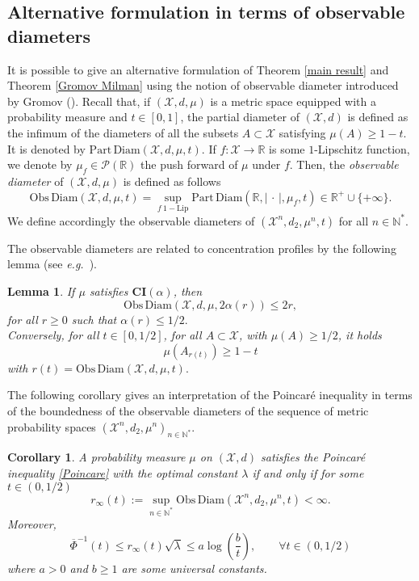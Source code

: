 \documentclass[11pt]{amsart}
\newtheorem{lem}[equation]{Lemma}
\newtheorem{cor}[equation]{Corollary}
\numberwithin{equation}{section}
\begin{document}
\subsection{Alternative formulation in terms of observable diameters} It is possible to give an alternative formulation of Theorem \ref{main result} and Theorem \ref{Gromov Milman} using the notion of observable diameter introduced by Gromov (\cite[Chapter 3.1/2]{Gromov-book}).
Recall that, if $({\mathcal{X}},d,\mu)$ is a metric space equipped with a probability measure and $t \in [0,1]$, the partial diameter of $({\mathcal{X}},d)$ is defined as the infimum of the diameters of all the subsets $A\subset {\mathcal{X}}$ satisfying $\mu(A)\geq 1-t.$ It is denoted by $\mathrm{Part\,Diam}({\mathcal{X}},d,\mu,t).$ If $f:{\mathcal{X}}\to{\mathbb{R}}$ is some $1$-Lipschitz function, we denote by $\mu_f \in \mathcal{P}({\mathbb{R}})$ the push forward of $\mu$ under $f$. Then, the \emph{observable diameter} of $({\mathcal{X}},d,\mu)$ is defined as follows
\[
\mathrm{Obs\,Diam}({\mathcal{X}},d,\mu,t)=\sup_{f\ 1-\text{Lip}} \mathrm{Part\,Diam}({\mathbb{R}},|\,\cdot\,|,\mu_f,t)\in {\mathbb{R}}^+\cup\{+\infty\} .
\]
We define accordingly the observable diameters of $({\mathcal{X}}^n,d_2,\mu^n,t)$ for all $n\in {\mathbb{N}}^*.$

The observable diameters are related to concentration profiles by the following lemma (see \textit{e.g.}\ \cite[Lemma 2.22]{FS12}).
\begin{lem}\label{lem:FS12}If $\mu$ satisfies $\mathbf{CI}(\alpha)$, then 
\[
\mathrm{Obs\,Diam}({\mathcal{X}},d,\mu,2\alpha(r)) \leq 2r,
\]
for all $r\geq0$ such that $\alpha(r)\leq 1/2.$\\
Conversely, for all $t\in [0,1/2]$, for all $A\subset {\mathcal{X}}$, with $\mu(A)\geq1/2$, it holds
\[
\mu(A_{r(t)}) \geq 1-t
\]
with $r(t)=\mathrm{Obs\,Diam}({\mathcal{X}},d,\mu,t).$
\end{lem}
The following corollary gives an interpretation of the Poincar\'e inequality in terms of the boundedness of the observable diameters of the sequence of metric probability spaces $({\mathcal{X}}^n,d_2,\mu^n)_{n\in {\mathbb{N}}^*}.$

\begin{cor}\label{cor:obs diam} A probability measure $\mu$ on $({\mathcal{X}},d)$ satisfies the Poincar\'e inequality \eqref{Poincare} with the optimal constant $\lambda$ if and only if for some $t\in (0,1/2)$ $$r_\infty(t):=\sup_{n\in {\mathbb{N}}^*} \mathrm{Obs\,Diam}({\mathcal{X}}^n,d_2,\mu^n,t)<\infty.$$
Moreover,
\[
\overline{\Phi}^{-1}(t)\leq r_\infty(t)\sqrt{\lambda} \leq a\log\left(\frac{b}{t}\right),\qquad \forall t\in (0,1/2)
\]
where $a>0$ and $b\geq1$ are some universal constants.

\end{cor}
\end{document}

